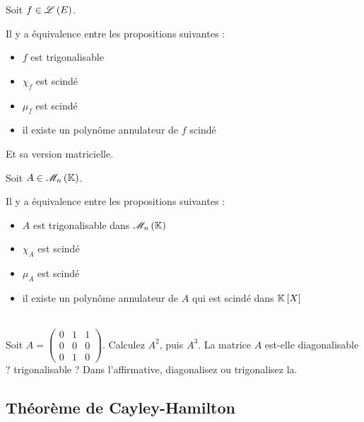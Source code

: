 \begin{theo}
Soit \(f\in\mathscr{L}\left(E\right)\).

Il y a équivalence entre les propositions suivantes :

\begin{itemize}
    \item \(f\)  est trigonalisable \\
    \item \(\chi_f\) est scindé \\
    \item \(\mu_f\) est scindé \\
    \item il existe un polynôme annulateur de \(f\) scindé
\end{itemize}
\end{theo}

Et sa version matricielle.

\begin{theo}
Soit \(A\in\M{n}\).

Il y a équivalence entre les propositions suivantes :

\begin{itemize}
    \item \(A\) est trigonalisable dans \(\M{n}\) \\
    \item \(\chi_A\) est scindé \\
    \item \(\mu_A\) est scindé \\
    \item il existe un polynôme annulateur de \(A\) qui est scindé dans \(\poly\)
\end{itemize}
\end{theo}

\begin{exo}~\\
Soit \(A=\begin{pmatrix}
0 & 1 & 1 \\
0 & 0 & 0 \\
0 & 1 & 0
\end{pmatrix}\). Calculez \(A^2\), puis \(A^3\). La matrice \(A\) est-elle diagonalisable ? trigonalisable ? Dans l'affirmative, diagonalisez ou trigonalisez la.
\end{exo}

\subsection{Théorème de Cayley-Hamilton}

